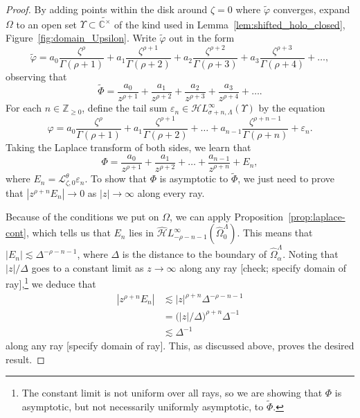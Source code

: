 \documentclass{article}
\newcommand{\singexp}[2]{\mathcal{H}L^\infty_{#1, #2}}
\newcommand{\dualsingexp}[1]{\widehat{\mathcal{H}}L^\infty_{#1}}
\newcommand{\Z}{\mathbb{Z}}
\newcommand{\C}{\mathbb{C}}
\newcommand{\series}[1]{\tilde{#1}}
\newcommand{\laplace}{\mathcal{L}}
\theoremstyle{definition}
\theoremstyle{plain}
\newenvironment{todo}{\color{Coral}}{\color{black}}
\newenvironment{revised}{\color{DarkBlue}}{\color{black}}
\newenvironment{revised}{}{}
\begin{document}
\begin{proof}
By adding points within the disk around $\zeta = 0$ where $\series{\varphi}$ converges, expand $\Omega$ to an open set $\Upsilon \subset \widetilde{\C^\times}$ of the kind used in Lemma~\ref{lem:shifted_holo_closed}, Figure~\ref{fig:domain_Upsilon}. Write $\series{\varphi}$ out in the form
\[ \series{\varphi} = a_0 \frac{\zeta^\rho}{\Gamma(\rho+1)} + a_1 \frac{\zeta^{\rho+1}}{\Gamma(\rho+2)} + a_2 \frac{\zeta^{\rho+2}}{\Gamma(\rho+3)} + a_3 \frac{\zeta^{\rho+3}}{\Gamma(\rho+4)} + \ldots, \]
observing that
\[ \series{\Phi} = \frac{a_0}{z^{\rho+1}} + \frac{a_1}{z^{\rho+2}} + \frac{a_2}{z^{\rho+3}} + \frac{a_3}{z^{\rho+4}} + \ldots. \]
For each $n \in \Z_{\ge 0}$, define the tail sum $\varepsilon_n \in \singexp{\sigma+n}{\Lambda}(\Upsilon)$ by the equation
\[ \varphi = a_0 \frac{\zeta^\rho}{\Gamma(\rho+1)} + a_1 \frac{\zeta^{\rho+1}}{\Gamma(\rho+2)} + \ldots + a_{n-1} \frac{\zeta^{\rho+n-1}}{\Gamma(\rho+n)} + \varepsilon_n. \]
Taking the Laplace transform of both sides, we learn that
\[ \Phi = \frac{a_0}{z^{\rho+1}} + \frac{a_1}{z^{\rho+2}} + \ldots + \frac{a_{n-1}}{z^{\rho+n}} + E_n, \]
where $E_n = \laplace_{\zeta, 0}^\theta \varepsilon_n$. To show that $\Phi$ is asymptotic to $\series{\Phi}$, we just need to prove that $|z^{\rho+n} E_n| \to 0$ as $|z| \to \infty$ along every ray.

Because of the conditions we put on $\Omega$, we can apply Proposition~\ref{prop:laplace-cont}, which tells us that $E_n$ lies in $\dualsingexp{-\rho-n-1}(\widehat{\Omega}_0^\Lambda)$. This means that $|E_n| \lesssim \Delta^{-\rho-n-1}$, where $\Delta$ is the distance to the boundary of $\widehat{\Omega}_\alpha^\Lambda$. Noting that \begin{revised}$|z|/\Delta$ goes to a constant limit as $z \to \infty$ along any ray \begin{todo}[check; specify domain of ray]\end{todo}\end{revised},\footnote{The constant limit is not uniform over all rays, so we are showing that $\Phi$ is asymptotic, but not necessarily uniformly asymptotic, to $\series{\Phi}$.} we deduce that
\begin{align*}
|z^{\rho+n} E_n| & \lesssim |z|^{\rho+n} \Delta^{-\rho-n-1} \\
& = \big(|z|/\Delta\big)^{\rho+n} \Delta^{-1} \\
& \lesssim \Delta^{-1}
\end{align*}
along any ray \begin{todo}[specify domain of ray]\end{todo}. This, as discussed above, proves the desired result.
\end{proof}
\color{black}
\end{document}
